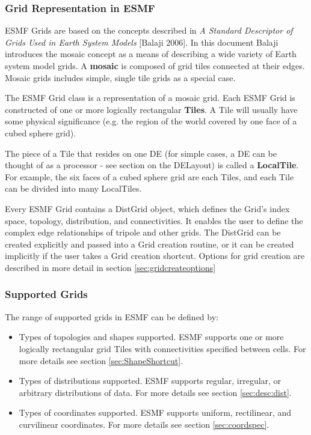 \subsubsection{Grid Representation in ESMF}

ESMF Grids are based on the concepts described in {\it A Standard Descriptor of Grids Used in Earth System Models} [Balaji 2006].  In this document
Balaji introduces the mosaic concept as a means of describing
a wide variety of Earth system model grids.  A {\bf mosaic} is
composed of grid tiles connected at their edges.  Mosaic grids
includes simple, single tile grids as a special case.  

The ESMF Grid class is a representation of a mosaic grid.  Each ESMF
Grid is constructed of one or more logically rectangular {\bf Tiles}.
A Tile will usually have some physical significance (e.g. the region
of the world covered by one face of a cubed sphere grid).

The piece of a Tile that resides on one DE (for simple cases, a DE
can be thought of as a processor - see section on the DELayout)
is called a {\bf LocalTile}.  For example, the six faces of a cubed
sphere grid are each Tiles, and each Tile can be divided into many
LocalTiles.  

Every ESMF Grid contains a DistGrid object, which defines the Grid's
index space, topology, distribution, and connectivities.  It enables
the user to define the complex edge relationships of tripole and other
grids.  The DistGrid can be created explicitly and passed into a Grid
creation routine, or it can be created implicitly if the user takes
a Grid creation shortcut.  Options for grid creation are described in 
more detail in section \ref{sec:gridcreateoptions}

\subsubsection{Supported Grids}

The range of supported grids in ESMF can be defined by:
\begin{itemize}
\item Types of topologies and shapes supported.  ESMF supports one or
more logically rectangular grid Tiles with connectivities specified
between cells.  For more details see section \ref{sec:ShapeShortcut}.
\item Types of distributions supported.  ESMF supports  regular,
irregular, or arbitrary distributions of data.  For more details see section 
\ref{sec:desc:dist}.
\item Types of coordinates supported.  ESMF supports uniform, rectilinear,
and curvilinear coordinates.  For more details see section \ref{sec:coordspec}.
\end{itemize}

